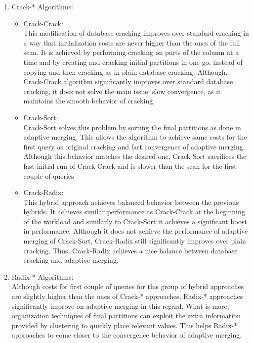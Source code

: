 \documentclass[10pt, conference, compsocconf]{IEEEtran}
\begin{document}
\begin{enumerate}
\item{Crack-* Algorithms:}
\begin{itemize}
\item{Crack-Crack:}\\
This modification of database cracking improves over standard cracking in a way that initialization costs are never higher than the ones of the full scan. It is achieved by performing cracking on parts of the column at a time and by creating and cracking initial partitions in one go, instead of copying and then cracking as in plain database cracking. Although, Crack-Crack algorithm significantly improves over standard database cracking, it does not solve the main issue: slow convergence, as it maintains the smooth behavior of cracking.\\
\item{Crack-Sort:}\\
Crack-Sort solves this problem by sorting the final partitions as done in adaptive merging. This allows the algorithm to achieve same costs for the first query as original cracking and fast convergence of adaptive merging. Although this behavior matches the desired one, Crack Sort sacrifices the fast initial run of Crack-Crack and is slower than the scan for the first couple of queries\\
\item{Crack-Radix:}\\
This hybrid approach achieves balanced behavior between the previous hybrids. It achieves similar performance as Crack-Crack at the beginning of the workload and similarly to Crack-Sort it achieves a significant boost in performance. Although it does not achieve the performance of adaptive merging of Crack-Sort, Crack-Radix still significantly improves over plain cracking. Thus, Crack-Radix achieves a nice balance between database cracking and adaptive merging.\\
\end{itemize}
\item{Radix-* Algorithms:}\\
Although costs for first couple of queries for this group of hybrid approaches are slightly higher than the ones of Crack-* approaches, Radix-* approaches significantly improve on adaptive merging in this regard. What is more, organization techniques of final partitions can exploit the extra information provided by clustering to quickly place relevant values. This helps Radix-* approaches to come closer to the convergence behavior of adaptive merging.
\end{enumerate}
\end{document}
